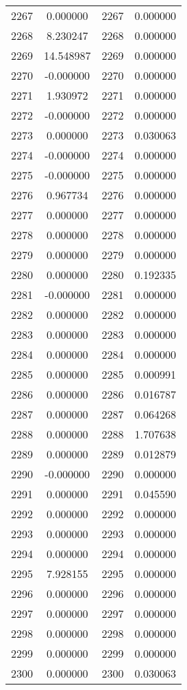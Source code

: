 \documentclass[12pt]{article}
\begin{document}
\begin{longtable}{@{}cccc@{}}
2267 & 0.000000 & 2267 & 0.000000 \\
2268 & 8.230247 & 2268 & 0.000000 \\
2269 & 14.548987 & 2269 & 0.000000 \\
2270 & -0.000000 & 2270 & 0.000000 \\
2271 & 1.930972 & 2271 & 0.000000 \\
2272 & -0.000000 & 2272 & 0.000000 \\
2273 & 0.000000 & 2273 & 0.030063 \\
2274 & -0.000000 & 2274 & 0.000000 \\
2275 & -0.000000 & 2275 & 0.000000 \\
2276 & 0.967734 & 2276 & 0.000000 \\
2277 & 0.000000 & 2277 & 0.000000 \\
2278 & 0.000000 & 2278 & 0.000000 \\
2279 & 0.000000 & 2279 & 0.000000 \\
2280 & 0.000000 & 2280 & 0.192335 \\
2281 & -0.000000 & 2281 & 0.000000 \\
2282 & 0.000000 & 2282 & 0.000000 \\
2283 & 0.000000 & 2283 & 0.000000 \\
2284 & 0.000000 & 2284 & 0.000000 \\
2285 & 0.000000 & 2285 & 0.000991 \\
2286 & 0.000000 & 2286 & 0.016787 \\
2287 & 0.000000 & 2287 & 0.064268 \\
2288 & 0.000000 & 2288 & 1.707638 \\
2289 & 0.000000 & 2289 & 0.012879 \\
2290 & -0.000000 & 2290 & 0.000000 \\
2291 & 0.000000 & 2291 & 0.045590 \\
2292 & 0.000000 & 2292 & 0.000000 \\
2293 & 0.000000 & 2293 & 0.000000 \\
2294 & 0.000000 & 2294 & 0.000000 \\
2295 & 7.928155 & 2295 & 0.000000 \\
2296 & 0.000000 & 2296 & 0.000000 \\
2297 & 0.000000 & 2297 & 0.000000 \\
2298 & 0.000000 & 2298 & 0.000000 \\
2299 & 0.000000 & 2299 & 0.000000 \\
2300 & 0.000000 & 2300 & 0.030063 \\

\end{longtable}
\end{document}

